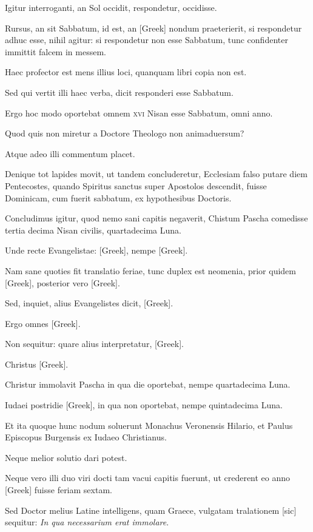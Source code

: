 \begin{parnumbers}
Igitur interroganti,
an Sol occidit, respondetur, occidisse.

Rursus, an sit Sabbatum, id
est, an \textgreek{[Greek]} nondum praeterierit, si respondetur adhuc
esse, nihil agitur: si respondetur non esse Sabbatum, tunc confidenter
immittit falcem in messem.

Haec profector est mens illius loci,
quanquam libri copia non est.

Sed qui vertit illi haec verba, dicit responderi
esse Sabbatum.

Ergo hoc modo oportebat omnem \textsc{xvi}
Nisan esse Sabbatum, omni anno.

Quod quis non miretur a Doctore
Theologo non animaduersum?

Atque adeo illi commentum
placet.

Denique tot lapides movit, ut tandem concluderetur, Ecclesiam
falso putare diem Pentecostes, quando Spiritus sanctus super
Apostolos descendit, fuisse Dominicam, cum fuerit sabbatum, ex
hypothesibus Doctoris.

Concludimus igitur, quod nemo sani capitis
negaverit, Chistum Pascha comedisse tertia decima Nisan civilis,
quartadecima Luna.

Unde recte Evangelistae: \textgreek{[Greek]},
nempe \textgreek{[Greek]}.

Nam sane quoties fit translatio feriae,
tunc duplex est neomenia, prior quidem \textgreek{[Greek]}, posterior vero
\textgreek{[Greek]}.

Sed, inquiet, alius Evangelistes dicit, \textgreek{[Greek]}.

Ergo omnes \textgreek{[Greek]}.

Non sequitur: quare alius interpretatur, \textgreek{[Greek]}.

Christus \textgreek{[Greek]}.

Christur immolavit Pascha in qua die
oportebat, nempe quartadecima Luna.

Iudaei postridie \textgreek{[Greek]},
in qua non oportebat, nempe quintadecima Luna.

Et ita quoque
hunc nodum soluerunt Monachus Veronensis Hilario, et Paulus
Episcopus Burgensis ex Iudaeo Christianus.

Neque melior solutio
dari potest.

Neque vero illi duo viri docti tam vacui capitis fuerunt,
ut crederent eo anno \textgreek{[Greek]} fuisse feriam sextam.

Sed Doctor melius Latine intelligens, quam Graece, vulgatam tralationem [sic]
sequitur: \textit{In qua necessarium erat immolare}.


\end{parnumbers}
